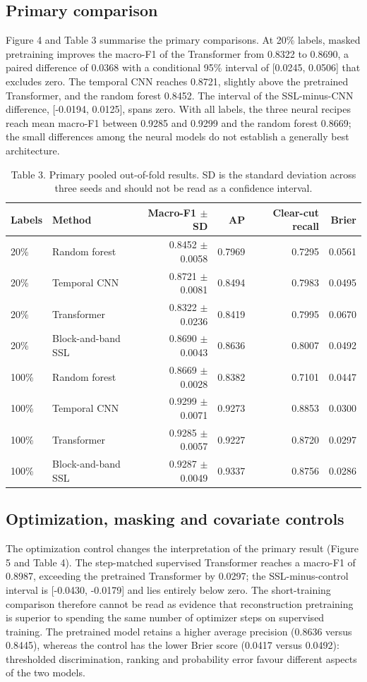\documentclass[11pt,a4paper]{article}
\begin{document}
\subsection{Primary comparison}
Figure 4 and Table 3 summarise the primary comparisons. At 20\% labels, masked pretraining improves the macro-F1 of the Transformer from 0.8322 to 0.8690, a paired difference of 0.0368 with a conditional 95\% interval of [0.0245, 0.0506] that excludes zero. The temporal CNN reaches 0.8721, slightly above the pretrained Transformer, and the random forest 0.8452. The interval of the SSL-minus-CNN difference, [-0.0194, 0.0125], spans zero. With all labels, the three neural recipes reach mean macro-F1 between 0.9285 and 0.9299 and the random forest 0.8669; the small differences among the neural models do not establish a generally best architecture.

\begin{table}[htbp]
\centering
\small
\caption{Table 3. Primary pooled out-of-fold results. SD is the standard deviation across three seeds and should not be read as a confidence interval.}
\begin{tabular}{llrrrr}
\toprule
Labels & Method & Macro-F1 $\pm$ SD & AP & Clear-cut recall & Brier \\ \midrule
20\% & Random forest & 0.8452 $\pm$ 0.0058 & 0.7969 & 0.7295 & 0.0561 \\
20\% & Temporal CNN & 0.8721 $\pm$ 0.0081 & 0.8494 & 0.7983 & 0.0495 \\
20\% & Transformer & 0.8322 $\pm$ 0.0236 & 0.8419 & 0.7995 & 0.0670 \\
20\% & Block-and-band SSL & 0.8690 $\pm$ 0.0043 & 0.8636 & 0.8007 & 0.0492 \\
100\% & Random forest & 0.8669 $\pm$ 0.0028 & 0.8382 & 0.7101 & 0.0447 \\
100\% & Temporal CNN & 0.9299 $\pm$ 0.0071 & 0.9273 & 0.8853 & 0.0300 \\
100\% & Transformer & 0.9285 $\pm$ 0.0057 & 0.9227 & 0.8720 & 0.0297 \\
100\% & Block-and-band SSL & 0.9287 $\pm$ 0.0049 & 0.9337 & 0.8756 & 0.0286 \\
\bottomrule
\end{tabular}
\end{table}

\subsection{Optimization, masking and covariate controls}
The optimization control changes the interpretation of the primary result (Figure 5 and Table 4). The step-matched supervised Transformer reaches a macro-F1 of 0.8987, exceeding the pretrained Transformer by 0.0297; the SSL-minus-control interval is [-0.0430, -0.0179] and lies entirely below zero. The short-training comparison therefore cannot be read as evidence that reconstruction pretraining is superior to spending the same number of optimizer steps on supervised training. The pretrained model retains a higher average precision (0.8636 versus 0.8445), whereas the control has the lower Brier score (0.0417 versus 0.0492): thresholded discrimination, ranking and probability error favour different aspects of the two models.
\end{document}
